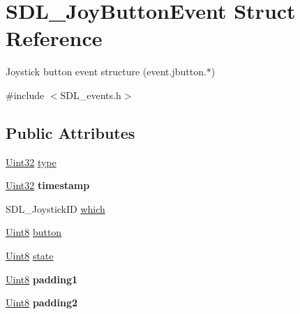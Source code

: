 \hypertarget{struct_s_d_l___joy_button_event}{}\section{S\+D\+L\+\_\+\+Joy\+Button\+Event Struct Reference}
\label{struct_s_d_l___joy_button_event}


Joystick button event structure (event.\+jbutton.$\ast$)  




{\ttfamily \#include $<$S\+D\+L\+\_\+events.\+h$>$}

\subsection*{Public Attributes}
\begin{DoxyCompactItemize}
\item 
\hyperlink{_s_d_l__stdinc_8h_add440eff171ea5f55cb00c4a9ab8672d}{Uint32} \hyperlink{struct_s_d_l___joy_button_event_a8f3312a046d37fa2884b93f69c4cb655}{type}
\item 
\hypertarget{struct_s_d_l___joy_button_event_ab50b6f7d1ab3ac53df69fc2d6cf5fa2a}{}\hyperlink{_s_d_l__stdinc_8h_add440eff171ea5f55cb00c4a9ab8672d}{Uint32} {\bfseries timestamp}\label{struct_s_d_l___joy_button_event_ab50b6f7d1ab3ac53df69fc2d6cf5fa2a}

\item 
S\+D\+L\+\_\+\+Joystick\+I\+D \hyperlink{struct_s_d_l___joy_button_event_a1679049adad7242b28420948fdc79044}{which}
\item 
\hyperlink{_s_d_l__stdinc_8h_a2944638813a090aa23e62f4da842c3e2}{Uint8} \hyperlink{struct_s_d_l___joy_button_event_a73ebe4261cf80564052af9c1af737a4d}{button}
\item 
\hyperlink{_s_d_l__stdinc_8h_a2944638813a090aa23e62f4da842c3e2}{Uint8} \hyperlink{struct_s_d_l___joy_button_event_ad3b6f8d9aa2c5e694f664b97d12bcd2b}{state}
\item 
\hypertarget{struct_s_d_l___joy_button_event_a3e7ca473fb7783d755d64598529b1ff9}{}\hyperlink{_s_d_l__stdinc_8h_a2944638813a090aa23e62f4da842c3e2}{Uint8} {\bfseries padding1}\label{struct_s_d_l___joy_button_event_a3e7ca473fb7783d755d64598529b1ff9}

\item 
\hypertarget{struct_s_d_l___joy_button_event_a77a78bee38f4bf0682ccd97bbf8f9ab9}{}\hyperlink{_s_d_l__stdinc_8h_a2944638813a090aa23e62f4da842c3e2}{Uint8} {\bfseries padding2}\label{struct_s_d_l___joy_button_event_a77a78bee38f4bf0682ccd97bbf8f9ab9}

\end{DoxyCompactItemize}


